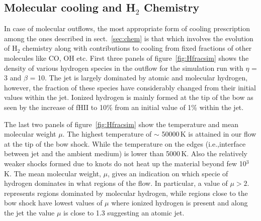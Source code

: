 \documentclass[useAMS,usenatbib,letters]{mn2e}
\newcommand{\figpath}{PFIGS/}
\begin{document}

\subsection{Molecular cooling and H$_2$ Chemistry}
In case of molecular outflows, the most appropriate form of cooling
prescription among the ones described in sect.~\ref{sec:chem} is
that which involves the evolution of H$_2$ chemistry along with
contributions to cooling from fixed fractions of other molecules like
CO, OH etc. First three panels of figure~\ref{fig:Hfracsim} shows the density of
various hydrogen species in the outflow for the simulation run with
$\eta$ = 3 and $\beta$ = 10. The jet is largely dominated by atomic
and molecular hydrogen, however, the fraction of these species have
considerably changed from their initial values within the
jet. Ionized hydrogen is mainly formed at the tip
of the bow as seen by the increase of fHII to 10\% from an initial value of
1\% within the jet.
%
 
The last two panels of figure~\ref{fig:Hfracsim}
show the temperature and mean molecular weight $\mu$. The
highest temperature of $\sim$ 50000\,K is attained in our flow at the
tip of the bow shock. While the temperature on the edges (i.e.,interface between
jet and the ambient medium) is lower than 5000\,K. Also the relatively
weaker shocks formed due to knots do not heat up the material beyond
few 10$^{3}$\, K. The mean molecular weight, $\mu$, gives an indication
on which specie of hydrogen dominates in what regions of the flow. In
particular, a value of $\mu > 2.$ represents regions dominated by
molecular hydrogen, while regions close to the bow shock have lowest
values of $\mu$ where ionized hydrogen is present and along the jet the value
$\mu$ is close to 1.3 suggesting an atomic jet. 
%
\end{document}
